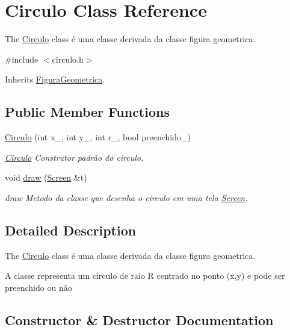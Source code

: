 \hypertarget{class_circulo}{}\section{Circulo Class Reference}
\label{class_circulo}


The \hyperlink{class_circulo}{Circulo} class é uma classe derivada da classe figura geometrica.  




{\ttfamily \#include $<$circulo.\+h$>$}



Inherits \hyperlink{class_figura_geometrica}{Figura\+Geometrica}.

\subsection*{Public Member Functions}
\begin{DoxyCompactItemize}
\item 
\hyperlink{class_circulo_a6807b8a1fea8a0ac9a058b0552038883}{Circulo} (int x\+\_\+, int y\+\_\+, int r\+\_\+, bool preenchido\+\_\+)
\begin{DoxyCompactList}\small\item\em \hyperlink{class_circulo}{Circulo} Construtor padrão do circulo. \end{DoxyCompactList}\item 
void \hyperlink{class_circulo_a593787d6e0618c2eded23e8839e7bea6}{draw} (\hyperlink{class_screen}{Screen} \&t)
\begin{DoxyCompactList}\small\item\em draw Metodo da classe que desenha o circulo em uma tela \hyperlink{class_screen}{Screen}. \end{DoxyCompactList}\end{DoxyCompactItemize}


\subsection{Detailed Description}
The \hyperlink{class_circulo}{Circulo} class é uma classe derivada da classe figura geometrica. 

A classe representa um circulo de raio R centrado no ponto (x,y) e pode ser preenchido ou não 

\subsection{Constructor \& Destructor Documentation}
\mbox{\label{class_circulo_a6807b8a1fea8a0ac9a058b0552038883}} 
